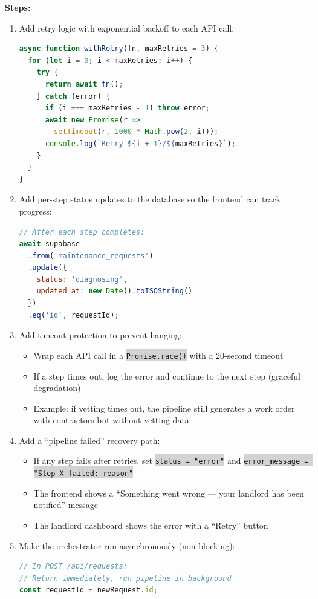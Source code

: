 \documentclass[11pt, a4paper]{article}
\newcommand{\code}[1]{\texttt{\small\colorbox{lightgray}{#1}}}
\begin{document}
\textbf{Steps:}
\begin{enumerate}[leftmargin=2em, itemsep=2pt]
  \item Add retry logic with exponential backoff to each API call:
\begin{lstlisting}[language=JavaScript]
async function withRetry(fn, maxRetries = 3) {
  for (let i = 0; i < maxRetries; i++) {
    try {
      return await fn();
    } catch (error) {
      if (i === maxRetries - 1) throw error;
      await new Promise(r => 
        setTimeout(r, 1000 * Math.pow(2, i)));
      console.log(`Retry ${i + 1}/${maxRetries}`);
    }
  }
}
\end{lstlisting}

  \item Add per-step status updates to the database so the frontend can track progress:
\begin{lstlisting}[language=JavaScript]
// After each step completes:
await supabase
  .from('maintenance_requests')
  .update({ 
    status: 'diagnosing', 
    updated_at: new Date().toISOString() 
  })
  .eq('id', requestId);
\end{lstlisting}

  \item Add timeout protection to prevent hanging:
    \begin{itemize}[itemsep=1pt]
      \item Wrap each API call in a \code{Promise.race()} with a 20-second timeout
      \item If a step times out, log the error and continue to the next step (graceful degradation)
      \item Example: if vetting times out, the pipeline still generates a work order with contractors but without vetting data
    \end{itemize}

  \item Add a ``pipeline failed'' recovery path:
    \begin{itemize}[itemsep=1pt]
      \item If any step fails after retries, set \code{status = "error"} and \code{error\_message = "Step X failed: reason"}
      \item The frontend shows a ``Something went wrong --- your landlord has been notified'' message
      \item The landlord dashboard shows the error with a ``Retry'' button
    \end{itemize}

  \item Make the orchestrator run asynchronously (non-blocking):
\begin{lstlisting}[language=JavaScript]
// In POST /api/requests:
// Return immediately, run pipeline in background
const requestId = newRequest.id;


\end{lstlisting}
\end{enumerate}
\end{document}
